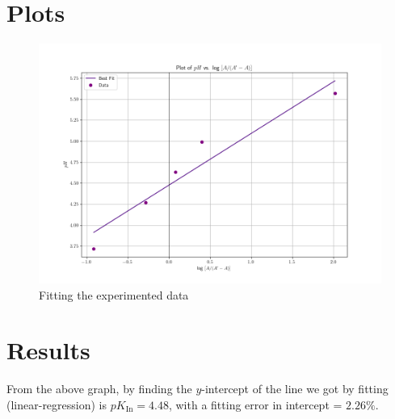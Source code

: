 \documentclass[11pt, a4paper, abstract=true]{scrartcl}
\begin{document}
\section{Plots}

\begin{figure}[H]
  \centering
  \includegraphics[scale=0.60]{plot.png}
  \caption{Fitting the experimented data}
\end{figure}

\section{Results}

From the above graph, by finding the \(y\)-intercept of the line we got by fitting (linear-regression) is \(pK_\text{In} = 4.48\), with a fitting error in intercept = \(2.26 \%\).
\end{document}
